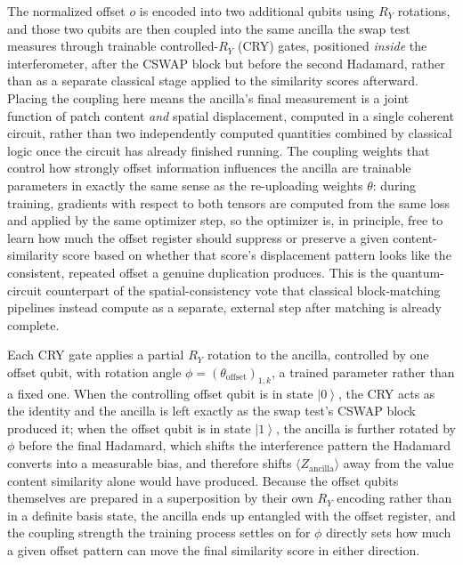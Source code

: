 \documentclass[conference]{IEEEtran}
\newcommand{\ket}[1]{\left|#1\right\rangle}
\begin{document}
The normalized offset $o$ is encoded into two additional qubits using $R_Y$ rotations, and those two qubits are then coupled into the same ancilla the swap test measures through trainable controlled-$R_Y$ (CRY) gates, positioned \emph{inside} the interferometer, after the CSWAP block but before the second Hadamard, rather than as a separate classical stage applied to the similarity scores afterward. Placing the coupling here means the ancilla's final measurement is a joint function of patch content \emph{and} spatial displacement, computed in a single coherent circuit, rather than two independently computed quantities combined by classical logic once the circuit has already finished running. The coupling weights that control how strongly offset information influences the ancilla are trainable parameters in exactly the same sense as the re-uploading weights $\theta$: during training, gradients with respect to both tensors are computed from the same loss and applied by the same optimizer step, so the optimizer is, in principle, free to learn how much the offset register should suppress or preserve a given content-similarity score based on whether that score's displacement pattern looks like the consistent, repeated offset a genuine duplication produces. This is the quantum-circuit counterpart of the spatial-consistency vote that classical block-matching pipelines instead compute as a separate, external step after matching is already complete.

Each CRY gate applies a partial $R_Y$ rotation to the ancilla, controlled by one offset qubit, with rotation angle $\phi = (\theta_{\text{offset}})_{1,k}$, a trained parameter rather than a fixed one. When the controlling offset qubit is in state $\ket{0}$, the CRY acts as the identity and the ancilla is left exactly as the swap test's CSWAP block produced it; when the offset qubit is in state $\ket{1}$, the ancilla is further rotated by $\phi$ before the final Hadamard, which shifts the interference pattern the Hadamard converts into a measurable bias, and therefore shifts $\langle Z_{\text{ancilla}}\rangle$ away from the value content similarity alone would have produced. Because the offset qubits themselves are prepared in a superposition by their own $R_Y$ encoding rather than in a definite basis state, the ancilla ends up entangled with the offset register, and the coupling strength the training process settles on for $\phi$ directly sets how much a given offset pattern can move the final similarity score in either direction.
\end{document}
